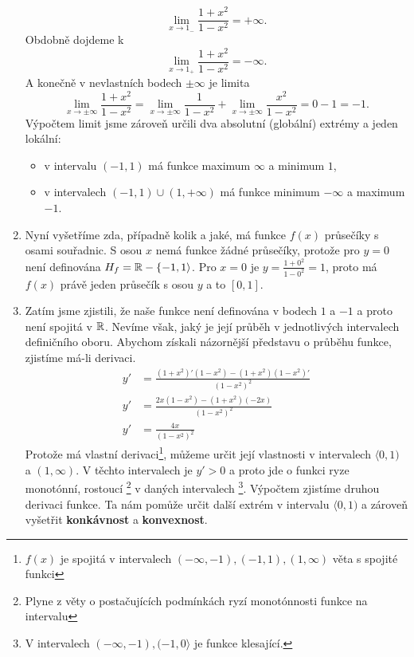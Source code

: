 \begin{mdframed}[style=mdexam]
\begin{example}
\begin{enumerate}[noitemsep]
          $$\lim_{x\to1_{-}}\frac{1+x^2}{1-x^2}=+\infty.$$ Obdobně dojdeme k
          $$\lim_{x\to1_+}\frac{1+x^2}{1-x^2}=-\infty.$$ A konečně v nevlastních bodech $±\infty$ je
          limita $$\lim_{x\to±\infty}\frac{1+x^2}{1-x^2} = \lim_{x\to\pm\infty}\frac{1}{1-x^2} +
          \lim_{x\to\pm\infty}\frac{x^2}{1-x^2}=0-1=-1.$$ Výpočtem limit jsme zároveň určili dva
          absolutní (globální) extrémy a jeden lokální:
          \begin{itemize}
            \item v intervalu $(-1,1)$ má funkce maximum $\infty$ a minimum $1$,
            \item v intervalech $(-1,1)\cup(1,+\infty)$ má funkce minimum $-\infty$ a maximum $-1$.
          \end{itemize}
      \item Nyní vyšetříme zda, případně kolik a jaké, má funkce $f(x)$ průsečíky s osami souřadnic.
          S osou $x$ nemá funkce žádné průsečíky, protože pro $y=0$ není definována
          $H_f=\mathbb{R}-\{-1,1\rangle$. Pro $x=0$ je $y=\frac{1+0^2}{1-0^2}=1$, proto má $f(x)$
          právě jeden průsečík s osou $y$ a to $[0,1]$.
      \item Zatím jsme zjistili, že naše funkce není definována v bodech $1$ a $-1$ a proto není
          spojitá v  $\mathbb{R}$. Nevíme však, jaký je její průběh v jednotlivých intervalech
          definičního oboru.  Abychom získali názornější představu o průběhu funkce, zjistíme má-li
          derivaci.
          \begin{align*}
            y' &= \frac{(1+x^2)'(1-x^2 )-(1+x^2)(1-x^2 )'}{(1-x^2)^2} \\
            y' &= \frac{2x(1-x^2 )-(1+x^2 )(-2x)}{(1-x^2 )^2}         \\
            y' &= \frac{4x}{(1-x^2 )^2}
          \end{align*}
          Protože má vlastní derivaci\footnote{$f(x)$ je spojitá v intervalech $(-\infty,-1),
          (-1,1),(1,\infty)$  věta s spojité funkci}, můžeme určit její vlastnosti v intervalech
          $\langle0,1)$ a $(1,\infty)$. V těchto intervalech je $y'>0$ a proto jde o funkci ryze
          monotónní, rostoucí \footnote{Plyne z věty o postačujících podmínkách ryzí monotónnosti
          funkce na intervalu} v daných intervalech \footnote{V intervalech
          $(-\infty,-1),(-1,0\rangle$ je funkce klesající.}. Výpočtem zjistíme druhou derivaci
          funkce. Ta nám pomůže určit další extrém v intervalu $\langle0,1)$ a zároveň vyšetřit
          \textbf{konkávnost} a \textbf{konvexnost}.

\end{enumerate}
\end{example}
\end{mdframed}
